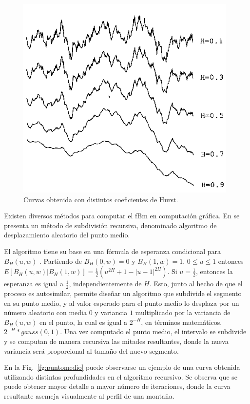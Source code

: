 \begin{figure}
\center
\includegraphics[width=11cm]{figures/hurst}
\caption{Curvas obtenida con distintos coeficientes de Hurst.}
\label{fg:hurst}
\end{figure}

Existen diversos métodos para computar el fBm en computación gráfica.
En \cite{Fournier1982} se presenta un método de subdivisión recursiva, denominado algoritmo de desplazamiento aleatorio del punto medio.

El algoritmo tiene su base en una fórmula de esperanza condicional para $B_{H}(u,w)$ \cite{Mandelbrot1968}.
Partiendo de $B_{H}(0,w) = 0$ y $B_{H}(1,w) = 1$, $0 \le u \le 1$ entonces $E[B_{H}(u,w)|B_{H}(1,w)] = \frac{1}{2} (u^{2H} + 1 - |u-1|^{2H})$.
Si $u=\frac{1}{2}$, entonces la esperanza es igual a $\frac{1}{2}$, independientemente de $H$.
Esto, junto al hecho de que el proceso es autosimilar, permite diseñar un algoritmo que subdivide el segmento en su punto medio, y al valor esperado para el punto medio lo desplaza por un número aleatorio con media $0$ y variancia $1$ multiplicado por la variancia de $B_{H}(u,w)$ en el punto, la cual es igual a $2^{-H}$, en términos matemáticos, $2^{-H} * gauss(0,1) $.
Una vez computado el punto medio, el intervalo se subdivide y se computan de manera recursiva las mitades resultantes, donde la nueva variancia será proporcional al tamaño del nuevo segmento.

En la Fig.~\ref{fg:puntomedio} puede observarse un ejemplo de una curva obtenida utilizando distintas profundidades en el algoritmo recursivo.
Se observa que se puede obtener mayor detalle a mayor número de iteraciones, donde la curva resultante asemeja visualmente al perfil de una montaña.

